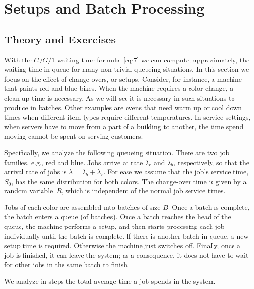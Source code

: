 \section{Setups and Batch Processing}
\label{sec:setups-batch-proc}

\subsection*{Theory and Exercises}


With the $G/G/1$ waiting time formula~\eqref{eq:7} we can compute, approximately,  the waiting time in queue for many non-trivial queueing situations. In this section we focus on the effect of change-overs, or setups. Consider, for instance, a  machine that paints red and blue bikes. When the machine requires a color change, a clean-up time is necessary. As we will see it is necessary in such situations to produce in batches.  Other examples are ovens that need  warm up or cool down times when different item types require different temperatures. In service settings, when servers have to move from a part of a building to another,  the time spend moving cannot be spent on serving customers.  

Specifically, we analyze the following queueing situation. There are two job families, e.g., red and blue. Jobs arrive at rate $\lambda_r$ and $\lambda_b$, respectively, so that the arrival rate of jobs is $\lambda= \lambda_b+\lambda_r$. For ease we assume that the job's service time, $S_0$, has the same distribution for both colors. The change-over time is given by a random variable~$R$, which is independent of the normal job service times. 

Jobs of each color are assembled into batches of size $B$. Once a batch is complete, the batch enters a queue (of batches). Once a batch reaches the head of the queue, the machine performs a setup, and then starts processing each job individually until the batch is complete. If there is another batch in queue, a new setup time is required. Otherwise the machine just switches off. Finally, once a job is finished, it can leave the system; as a consequence, it does not have to wait for other jobs in the same batch to finish.  

We analyze in steps the total average time a job spends in the system. 

